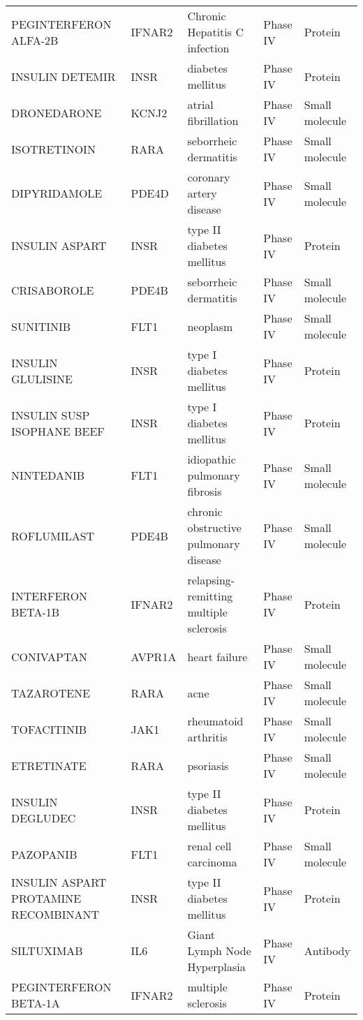 \documentclass[fleqn,10pt]{SelfArx} %
\begin{document}
\begin{table}[ht]
\begin{tabular}{|lllll|}
		PEGINTERFERON ALFA-2B & IFNAR2 & Chronic Hepatitis C infection & Phase IV & Protein \\ 
		INSULIN DETEMIR & INSR & diabetes mellitus & Phase IV & Protein \\ 
		DRONEDARONE & KCNJ2 & atrial fibrillation & Phase IV & Small molecule \\ 
		ISOTRETINOIN & RARA & seborrheic dermatitis & Phase IV & Small molecule \\ 
		DIPYRIDAMOLE & PDE4D & coronary artery disease & Phase IV & Small molecule \\ 
		INSULIN ASPART & INSR & type II diabetes mellitus & Phase IV & Protein \\ 
		CRISABOROLE & PDE4B & seborrheic dermatitis & Phase IV & Small molecule \\ 
		SUNITINIB & FLT1 & neoplasm & Phase IV & Small molecule \\ 
		INSULIN GLULISINE & INSR & type I diabetes mellitus & Phase IV & Protein \\ 
		INSULIN SUSP ISOPHANE BEEF & INSR & type I diabetes mellitus & Phase IV & Protein \\ 
		NINTEDANIB & FLT1 & idiopathic pulmonary fibrosis & Phase IV & Small molecule \\ 
		ROFLUMILAST & PDE4B & chronic obstructive pulmonary disease & Phase IV & Small molecule \\ 
		INTERFERON BETA-1B & IFNAR2 & relapsing-remitting multiple sclerosis & Phase IV & Protein \\ 
		CONIVAPTAN & AVPR1A & heart failure & Phase IV & Small molecule \\ 
		TAZAROTENE & RARA & acne & Phase IV & Small molecule \\ 
		TOFACITINIB & JAK1 & rheumatoid arthritis & Phase IV & Small molecule \\ 
		ETRETINATE & RARA & psoriasis & Phase IV & Small molecule \\ 
		INSULIN DEGLUDEC & INSR & type II diabetes mellitus & Phase IV & Protein \\ 
		PAZOPANIB & FLT1 & renal cell carcinoma & Phase IV & Small molecule \\ 
		INSULIN ASPART PROTAMINE RECOMBINANT & INSR & type II diabetes mellitus & Phase IV & Protein \\ 
		SILTUXIMAB & IL6 & Giant Lymph Node Hyperplasia & Phase IV & Antibody \\ 
		PEGINTERFERON BETA-1A & IFNAR2 & multiple sclerosis & Phase IV & Protein \\ 

\end{tabular}
\end{table}
\end{document}
